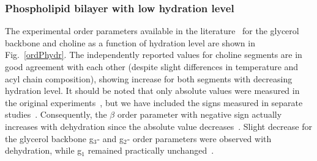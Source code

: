 \documentclass[pre,aps,floatfix,authordate1-4,twocolumn]{revtex4-1}
\begin{document}
\subsubsection{Phospholipid bilayer with low hydration level}
The experimental order parameters available in the literature~\cite{dvinskikh05b,ulrich94,bechinger91} 
for the glycerol backbone and choline as a function of hydration level are shown in Fig.~\ref{ordPhydr}. 
The independently reported values for choline segments are in good agreement with each other (despite 
slight differences in temperature and acyl chain composition),
showing increase for both segments with decreasing hydration level. It should be noted that only 
absolute values were measured in the original experiments~\cite{dvinskikh05b,ulrich94,bechinger91}, but
we have included the signs measured in separate studies~\cite{hong95a,hong95b,gross97}. 
Consequently, the $\beta$ order parameter with negative sign actually increases with dehydration 
since the absolute value decreases~\cite{dvinskikh05b,ulrich94,bechinger91}.
Slight decrease for the glycerol backbone g$_3$- and g$_2$- order parameters were observed with dehydration, 
while g$_1$ remained practically unchanged~\cite{dvinskikh05b}.
\end{document}
